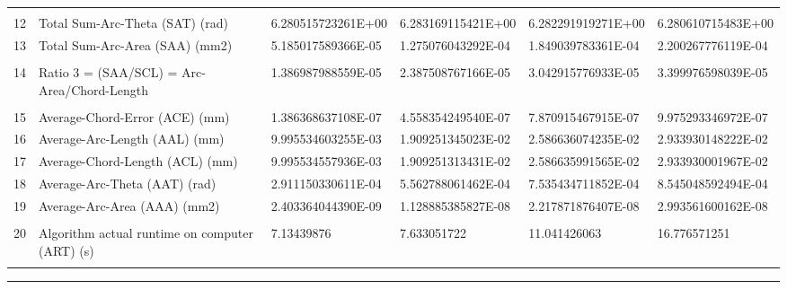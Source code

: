 \begin{landscape}
\begin{table}[ht]
{\begin{tabular}{ p{0.2cm} p{8.80cm} p{4.00cm} p{4.0cm} p{4.00cm} p{4.0cm}}
&		&		&		&		&		\\
12	&	Total Sum-Arc-Theta (SAT) (rad)	&	6.280515723261E+00	&	6.283169115421E+00	&	6.282291919271E+00	&	6.280610715483E+00	\\
13	&	Total Sum-Arc-Area (SAA) (mm2)	&	5.185017589366E-05	&	1.275076043292E-04	&	1.849039783361E-04	&	2.200267776119E-04	\\
&		&		&		&		&		\\
14	&	Ratio 3 = (SAA/SCL) = Arc-Area/Chord-Length	&	1.386987988559E-05	&	2.387508767166E-05	&	3.042915776933E-05	&	3.399976598039E-05	\\
&		&		&		&		&		\\
15	&	Average-Chord-Error (ACE) (mm)	&	1.386368637108E-07	&	4.558354249540E-07	&	7.870915467915E-07	&	9.975293346972E-07	\\
16	&	Average-Arc-Length (AAL) (mm)	&	9.995534603255E-03	&	1.909251345023E-02	&	2.586636074235E-02	&	2.933930148222E-02	\\
17	&	Average-Chord-Length (ACL) (mm)	&	9.995534557936E-03	&	1.909251313431E-02	&	2.586635991565E-02	&	2.933930001967E-02	\\
18	&	Average-Arc-Theta (AAT) (rad)	&	2.911150330611E-04	&	5.562788061462E-04	&	7.535434711852E-04	&	8.545048592494E-04	\\
19	&	Average-Arc-Area (AAA) (mm2)	&	2.403364044390E-09	&	1.128885385827E-08	&	2.217871876407E-08	&	2.993561600162E-08	\\
&		&		&		&		&		\\
20	&	Algorithm actual runtime on computer (ART) (s) 	&	7.13439876	&	7.633051722	&	11.041426063	&	16.776571251	\\
&		&		&		&		&		

\end{tabular}
			
}   %
\hrule
\end{table}
\end{landscape}

